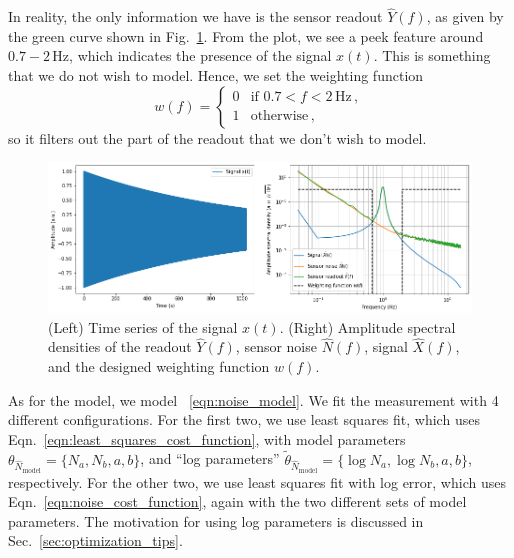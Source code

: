 In reality, the only information we have is the sensor readout $\hat{Y}(f)$, as given by the green curve shown in Fig.~\ref{fig:tutorialsnoisespectrummodelingwithoptimization10}.
From the plot, we see a peek feature around $0.7 - 2\,\mathrm{Hz}$, which indicates the presence of the signal $x(t)$.
This is something that we do not wish to model.
Hence, we set the weighting function
\begin{equation}
	w(f)=
	\begin{cases}
		0 & \text{if }0.7<f<2\,\mathrm{Hz}\,,\\
		1 & \text{otherwise}\,,
	\end{cases}
\end{equation}
so it filters out the part of the readout that we don't wish to model.
\begin{figure}[!h]
	\centering
	\includegraphics[width=1\linewidth]{figures/tutorials_noise_spectrum_modeling_with_optimization_1_0}
	\caption{(Left) Time series of the signal $x(t)$. (Right) Amplitude spectral densities of the readout $\hat{Y}(f)$, sensor noise $\hat{N}(f)$, signal $\hat{X}(f)$, and the designed weighting function $w(f)$.}
	\label{fig:tutorialsnoisespectrummodelingwithoptimization10}
\end{figure}

As for the model, we model ~\eqref{eqn:noise_model}.
We fit the measurement with 4 different configurations.
For the first two, we use least squares fit, which uses Eqn.~\eqref{eqn:least_squares_cost_function}, with model parameters $\theta_{\hat{N}_\mathrm{model}}=\{N_a, N_b, a, b\}$, and ``log parameters'' $\tilde{\theta}_{\hat{N}_\mathrm{model}}=\{\log N_a, \log N_b, a, b\}$, respectively.
For the other two, we use least squares fit with log error, which uses Eqn.~\eqref{eqn:noise_cost_function}, again with the two different sets of model parameters.
The motivation for using log parameters is discussed in Sec.~\ref{sec:optimization_tips}.


